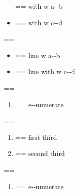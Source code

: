 \documentclass{book}
\makeatletter
\newenvironment{Texinfopreformatted}{%
  \par\GNUTobeylines\obeyspaces\frenchspacing\parskip=\z@\parindent=\z@}{}
{\catcode`\^^M=13 \gdef\GNUTobeylines{\catcode`\^^M=13 \def^^M{\null\par}}}
\newenvironment{Texinfoindented}{\begin{list}{}{}\item\relax}{\end{list}}
\renewcommand{\_}{\Texinfounderscore\discretionary{}{}{}}
\makeatother
\begin{document}
\begin{Texinfoindented}
\begin{itemize}[label={}]
\begin{Texinfopreformatted}
\ttfamily with w a{-}{-}b
\end{Texinfopreformatted}
\item \begin{Texinfopreformatted}%
\ttfamily with w c{-}{-}d
\end{Texinfopreformatted}
\end{itemize}
\begin{Texinfopreformatted}%
\ttfamily 
\end{Texinfopreformatted}
\begin{itemize}[label=\hbox{} on a line]
\item \begin{Texinfopreformatted}%
\ttfamily line w a{-}{-}b
\end{Texinfopreformatted}
\item \begin{Texinfopreformatted}%
\ttfamily line with w c{-}{-}d
\end{Texinfopreformatted}
\end{itemize}
\begin{Texinfopreformatted}%
\ttfamily 
\end{Texinfopreformatted}
\begin{enumerate}[start=1]
\item \begin{Texinfopreformatted}%
\ttfamily e{-}{-}numerate
\end{Texinfopreformatted}
\end{enumerate}
\begin{Texinfopreformatted}%
\ttfamily 
\end{Texinfopreformatted}
\begin{enumerate}[start=3]
\item \begin{Texinfopreformatted}%
\ttfamily first third
\end{Texinfopreformatted}
\item \begin{Texinfopreformatted}%
\ttfamily second third
\end{Texinfopreformatted}
\end{enumerate}
\begin{Texinfopreformatted}%
\ttfamily 
\end{Texinfopreformatted}
\begin{enumerate}[label=\alph*.]
\item \begin{Texinfopreformatted}%
\ttfamily e{-}{-}numerate
\end{Texinfopreformatted}

\end{enumerate}
\end{Texinfoindented}
\end{document}
